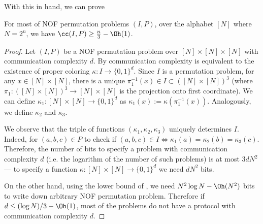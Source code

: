 With this in hand, we can prove
\begin{theorem}
For most of NOF permutation problems $(I, P)$, over the alphabet $[N]$ where $N = 2^n$, we have $\cc(I,P) \geq \frac{n}{3} - \Oh(1)$.
\end{theorem}
\begin{proof}
Let $(I, P)$ be a NOF permutation problem over $[N] \times [N] \times [N]$ with communication complexity $d$. By  communication complexity is equivalent to the existence of proper coloring $\kappa : I \to \{0, 1\}^d$. Since $I$ is a permutation problem, for any $x \in [N] \times [N]$, there is a unique $\pi_1^{-1}(x) \in I \subset ([N] \times [N])^3$ (where $\pi_1 : ([N] \times [N])^3 \to [N] \times [N]$ is the projection onto first coordinate). We can define $\kappa_1 : [N] \times [N] \to \{0, 1\}^d$ as $\kappa_1(x) := \kappa(\pi_1^{-1}(x))$. Analogously, we define $\kappa_2$ and $\kappa_3$.

We observe that the triple of functions $(\kappa_1, \kappa_2, \kappa_3)$ uniquely determines $I$. Indeed, for $(a,b,c) \in P$ to check if $(a,b,c) \in I \iff \kappa_1(a) = \kappa_2(b) = \kappa_3(c)$. Therefore, the number of bits to specify a problem with communication complexity $d$ (i.e. the logarithm of the number of such problems) is at most $3 d N^2$ --- to specify a function $\kappa : [N] \times [N] \to \{0,1\}^d$ we need $d N^2$ bits.

On the other hand, using the lower bound of , we need $N^2 \log N - \Oh(N^2)$ bits to write down arbitrary NOF permutation problem. Therefore if $d \leq (\log N) / 3 - \Oh(1)$, most of the problems do not have a protocol with communication complexity $d$.
\end{proof}

